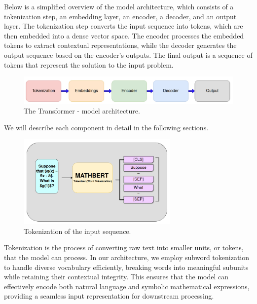\documentclass{article}
\begin{document}
Below is a simplified overview of the model architecture, which consists of a tokenization step, an embedding layer, an encoder, a decoder, and an output layer. The tokenization step converts the input sequence into tokens, which are then embedded into a dense vector space. The encoder processes the embedded tokens to extract contextual representations, while the decoder generates the output sequence based on the encoder's outputs. The final output is a sequence of tokens that represent the solution to the input problem.

\begin{figure}[htbp]
  \centering
  \includegraphics[width=\textwidth]{./figures/model_simplified.png}
  \caption{The Transformer - model architecture.}
  \label{fig:model-arch}
\end{figure}

We will describe each component in detail in the following sections.

\begin{figure}[htbp]
  \centering
  \includegraphics[width=0.7\textwidth]{./figures/tokenization.png}
  \caption{Tokenization of the input sequence.}
  \label{fig:tokenization}
\end{figure}

Tokenization is the process of converting raw text into smaller units, or tokens, that the model can process. In our architecture, we employ subword tokenization to handle diverse vocabulary efficiently, breaking words into meaningful subunits while retaining their contextual integrity. This ensures that the model can effectively encode both natural language and symbolic mathematical expressions, providing a seamless input representation for downstream processing.
\end{document}
